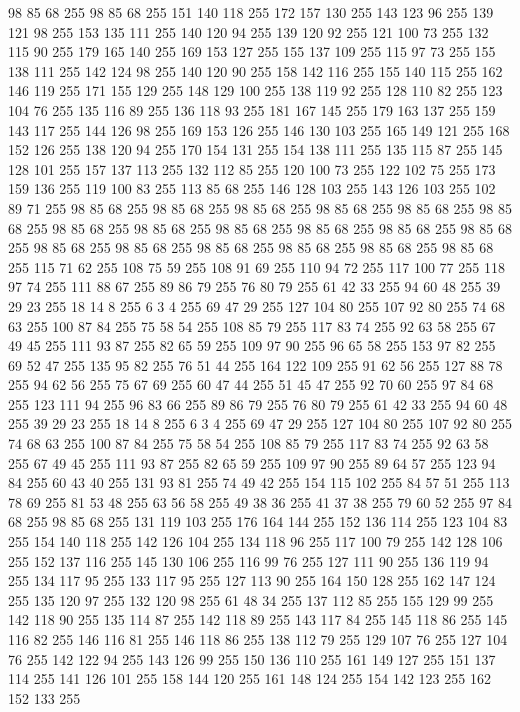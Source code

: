 98 85 68 255 98 85 68 255 151 140 118 255 172 157 130 255 143 123 96 255 139 121 98 255 153 135 111 255 140 120 94 255 139 120 92 255 121 100 73 255 132 115 90 255 179 165 140 255 169 153 127 255 155 137 109 255 115 97 73 255 155 138 111 255 142 124 98 255 140 120 90 255 158 142 116 255 155 140 115 255 162 146 119 255 171 155 129 255 148 129 100 255 138 119 92 255 128 110 82 255 123 104 76 255 135 116 89 255 136 118 93 255 181 167 145 255 179 163 137 255 159 143 117 255 144 126 98 255 169 153 126 255 146 130 103 255 165 149 121 255 168 152 126 255 138 120 94 255 170 154 131 255 154 138 111 255 135 115 87 255 145 128 101 255 157 137 113 255 132 112 85 255 120 100 73 255 122 102 75 255 173 159 136 255 119 100 83 255 113 85 68 255 146 128 103 255 143 126 103 255 102 89 71 255 98 85 68 255 98 85 68 255 98 85 68 255 98 85 68 255 98 85 68 255 98 85 68 255 98 85 68 255 98 85 68 255 98 85 68 255 98 85 68 255 98 85 68 255 98 85 68 255 98 85 68 255
98 85 68 255 98 85 68 255 98 85 68 255 98 85 68 255 98 85 68 255 115 71 62 255 108 75 59 255 108 91 69 255 110 94 72 255 117 100 77 255 118 97 74 255 111 88 67 255 89 86 79 255 76 80 79 255 61 42 33 255 94 60 48 255 39 29 23 255 18 14 8 255 6 3 4 255 69 47 29 255 127 104 80 255 107 92 80 255 74 68 63 255 100 87 84 255 75 58 54 255 108 85 79 255 117 83 74 255 92 63 58 255 67 49 45 255 111 93 87 255 82 65 59 255 109 97 90 255 96 65 58 255 153 97 82 255 69 52 47 255 135 95 82 255 76 51 44 255 164 122 109 255 91 62 56 255 127 88 78 255 94 62 56 255 75 67 69 255 60 47 44 255 51 45 47 255 92 70 60 255 97 84 68 255 123 111 94 255 96 83 66 255 89 86 79 255 76 80 79 255 61 42 33 255 94 60 48 255 39 29 23 255 18 14 8 255 6 3 4 255 69 47 29 255 127 104 80 255 107 92 80 255 74 68 63 255 100 87 84 255 75 58 54 255 108 85 79 255 117 83 74 255 92 63 58 255
67 49 45 255 111 93 87 255 82 65 59 255 109 97 90 255 89 64 57 255 123 94 84 255 60 43 40 255 131 93 81 255 74 49 42 255 154 115 102 255 84 57 51 255 113 78 69 255 81 53 48 255 63 56 58 255 49 38 36 255 41 37 38 255 79 60 52 255 97 84 68 255 98 85 68 255 131 119 103 255 176 164 144 255 152 136 114 255 123 104 83 255 154 140 118 255 142 126 104 255 134 118 96 255 117 100 79 255 142 128 106 255 152 137 116 255 145 130 106 255 116 99 76 255 127 111 90 255 136 119 94 255 134 117 95 255 133 117 95 255 127 113 90 255 164 150 128 255 162 147 124 255 135 120 97 255 132 120 98 255 61 48 34 255 137 112 85 255 155 129 99 255 142 118 90 255 135 114 87 255 142 118 89 255 143 117 84 255 145 118 86 255 145 116 82 255 146 116 81 255 146 118 86 255 138 112 79 255 129 107 76 255 127 104 76 255 142 122 94 255 143 126 99 255 150 136 110 255 161 149 127 255 151 137 114 255 141 126 101 255 158 144 120 255 161 148 124 255 154 142 123 255 162 152 133 255
